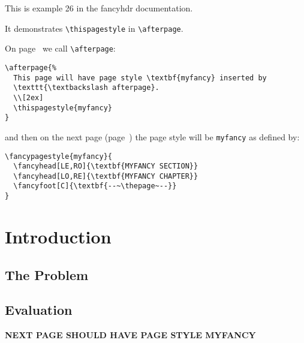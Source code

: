 \documentclass[openany]{book}
\begin{document}
\tableofcontents

\bigskip

\thispagestyle{plain}
\noindent
\begin{boxedminipage}{\textwidth}
This is example 26 in the fancyhdr documentation.

It demonstrates \verb|\thispagestyle| in \verb|\afterpage|.

On page~\pageref{setafterpage} we call \verb|\afterpage|:
\begin{verbatim}
\afterpage{%
  This page will have page style \textbf{myfancy} inserted by
  \texttt{\textbackslash afterpage}.
  \\[2ex]
  \thispagestyle{myfancy}
}
\end{verbatim}
and then on the next page (page~\pageref{afterpage})
 the page style will be \texttt{myfancy} as defined by:
\begin{verbatim}
\fancypagestyle{myfancy}{
  \fancyhead[LE,RO]{\textbf{MYFANCY SECTION}}
  \fancyhead[LO,RE]{\textbf{MYFANCY CHAPTER}}
  \fancyfoot[C]{\textbf{--~\thepage~--}}
}
\end{verbatim}

\end{boxedminipage}

\pagestyle{headings}

\chapter{Introduction}

\bigskip

\lipsum[1]

\section{The Problem}
\label{sec:problem}

\lipsum[2-3]

\section{Evaluation}


\label{setafterpage}\textbf{NEXT PAGE SHOULD HAVE PAGE STYLE MYFANCY}
\end{document}
